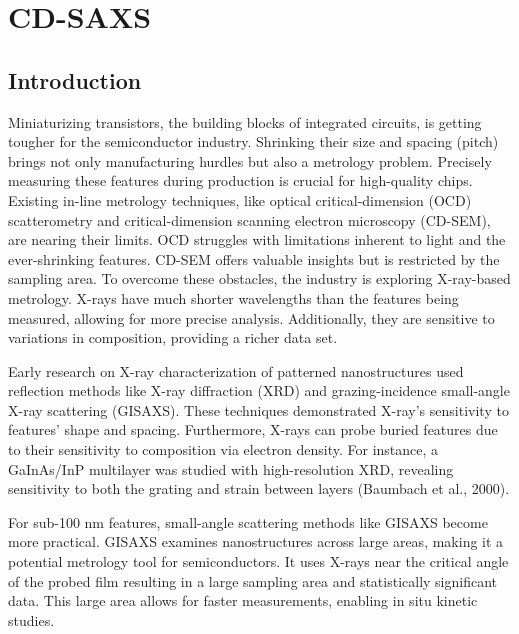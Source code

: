\section{CD-SAXS}
\subsection{Introduction}

\medskip

Miniaturizing transistors, the building blocks of integrated circuits, is getting
tougher for the semiconductor industry. Shrinking their size and spacing (pitch)
brings not only manufacturing hurdles but also a metrology problem. Precisely
measuring these features during production is crucial for high-quality chips.
Existing in-line metrology techniques, like optical critical-dimension (OCD)
scatterometry and critical-dimension scanning electron microscopy (CD-SEM), are
nearing their limits. OCD struggles with limitations inherent to light and the
ever-shrinking features. CD-SEM offers valuable insights but is restricted by
the sampling area. To overcome these obstacles, the industry is exploring X-ray-based metrology.
X-rays have much shorter wavelengths than the features being measured, allowing
for more precise analysis. Additionally, they are sensitive to variations in
composition, providing a richer data set.

\medskip

Early research on X-ray characterization of patterned nanostructures used reflection
methods like X-ray diffraction (XRD) and grazing-incidence small-angle X-ray scattering (GISAXS). 
These techniques demonstrated X-ray's sensitivity to features' shape and spacing.
Furthermore, X-rays can probe buried features due to their sensitivity to composition via electron density. For instance, a GaInAs/InP multilayer was studied with high-resolution XRD, revealing 
sensitivity to both the grating and strain between layers (Baumbach et al., 2000).

\medskip

For sub-100 nm features, small-angle scattering methods like GISAXS become more practical. 
GISAXS examines nanostructures across large areas, making it a potential metrology tool 
for semiconductors. It uses X-rays near the critical angle of the probed film
resulting in a large sampling area and statistically significant data. This large area allows for faster measurements, enabling in situ kinetic studies.

\medskip

